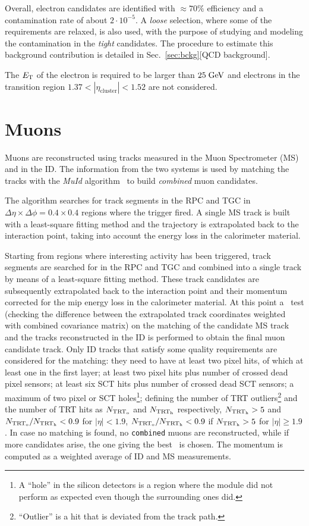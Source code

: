 Overall, electron candidates are identified with \mbox{$\approx{}70\%$} 
efficiency and a contamination rate of about \mbox{$2\cdot{}10^{-5}$}.
A {\it loose} selection, where some of the requirements are relaxed, 
is also used, with the purpose of studying and modeling the contamination
in the {\it tight} candidates. The procedure to estimate this background
contribution is detailed in Sec.~\ref{sec:bckg}[QCD background].

The $\mbox{\ensuremath{E_{\mathrm{T}}}}$ of the electron is required to be larger than \mbox{$25 \; \mathrm{GeV}$}
and electrons in the transition region $1.37<|\eta_{\mathrm{cluster}}|<1.52$
are not considered.

\section{Muons}
\label{sec:muons}

Muons are reconstructed using tracks measured in the 
Muon Spectrometer (MS) and in the ID.
The information from the two systems is used by matching
the tracks with the {\it MuId} algorithm~\cite{muidalgo} to build 
{\it combined} muon candidates.

The algorithm searches for track segments in the RPC and TGC in
$\Delta\eta\times\Delta\phi=0.4\times0.4$ regions where the trigger
fired. A single MS track is built with a least-square fitting method and
the trajectory is extrapolated back to the interaction point, taking
into account the energy loss in the calorimeter material. 



Starting from regions where interesting activity has been triggered,
track segments are searched for in the RPC and TGC and combined into a single track by means of a
least-square fitting method. These track candidates are 
subsequently extrapolated back to the interaction
point and their momentum corrected for the mip energy loss in the calorimeter material.
At this point a \chisq\ test (checking the difference between the extrapolated track coordinates weighted with
combined covariance matrix) on the matching of the candidate MS track and the tracks reconstructed in 
the ID is performed to obtain the final muon candidate track. Only ID tracks that satisfy some quality 
requirements are considered for the matching: they need to have at least two pixel hits, of which at least
one in the first layer; at least two pixel hits plus number of crossed dead pixel sensors; at least six SCT hits
plus number of  crossed dead SCT sensors; a maximum of two pixel or SCT holes\footnote{A ``hole'' in the silicon
detectors is a region where the module did not perform as expected even though the surrounding ones did.};
defining the number of TRT outliers\footnote{``Outlier'' is a hit that is deviated from the track path.} 
and the number of TRT hits as $N_{\rm TRT_{o}}$ and  $N_{\rm TRT_{h}}$ respectively, 
$N_{\rm TRT_{h}}>5$ and $N_{\rm TRT_{o}}/N_{\rm TRT_{h}}<0.9$ for $|\eta|<1.9$, 
$N_{\rm TRT_{o}}/N_{\rm TRT_{h}}<0.9$ if $N_{\rm TRT_{h}}>5$ for  $|\eta|\geq1.9$.
In case no matching is found, no \texttt{combined} 
muons are reconstructed, while if more candidates arise, the one giving the best \chisq\ is chosen.
The momentum is computed as a weighted average of ID and MS measurements.

